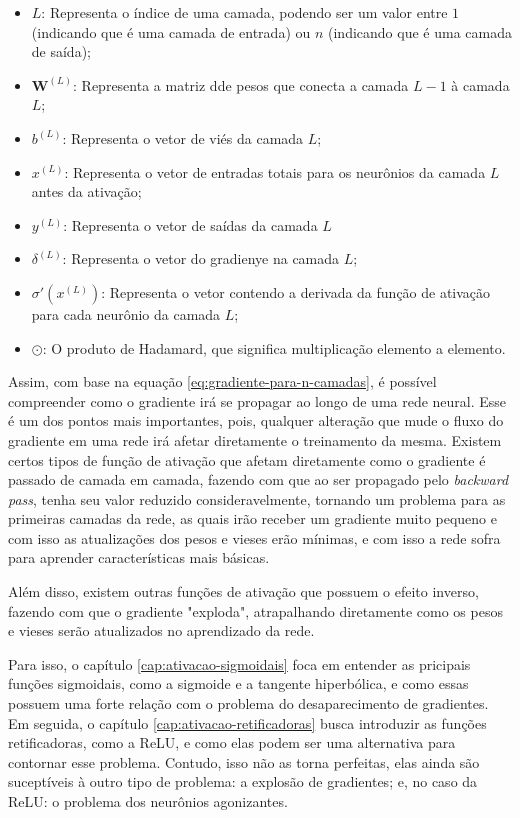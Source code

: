 \begin{itemize}
    \item $L$: Representa o índice de uma camada, podendo ser um valor entre $1$ (indicando que é uma camada de entrada) ou $n$ (indicando que é uma camada de saída);
    \item $\textbf{W}^{(L)}$: Representa a matriz dde pesos que conecta a camada $L - 1$ à camada $L$;
    \item $b^{(L)}$: Representa o vetor de viés da camada $L$;
    \item $x^{(L)}$: Representa o vetor de entradas totais para os neurônios da camada $L$ antes da ativação;
    \item $y^{(L)}$: Representa o vetor de saídas da camada $L$
    \item $\delta^{(L)}$: Representa o vetor do gradienye na camada $L$;
    \item $\sigma'(x^{(L)})$: Representa o vetor contendo a derivada da função de ativação para cada neurônio da camada $L$;
    \item $\odot$: O produto de Hadamard, que significa multiplicação elemento a elemento.
\end{itemize}

Assim, com base na equação \ref{eq:gradiente-para-n-camadas}, é possível compreender como o gradiente irá se propagar ao longo de uma rede neural. Esse é um dos pontos mais importantes, pois, qualquer alteração que mude o fluxo do gradiente em uma rede irá afetar diretamente o treinamento da mesma. Existem certos tipos de função de ativação que afetam diretamente como o gradiente é passado de camada em camada, fazendo com que ao ser propagado pelo \textit{backward pass}, tenha seu valor reduzido consideravelmente, tornando um problema para as primeiras camadas da rede, as quais irão receber um gradiente muito pequeno e com isso as atualizações dos pesos e vieses erão mínimas, e com isso a rede sofra para aprender características mais básicas. 

Além disso, existem outras funções de ativação que possuem o efeito inverso, fazendo com que o gradiente "exploda", atrapalhando diretamente como os pesos e vieses serão atualizados no aprendizado da rede.

Para isso, o capítulo \ref{cap:ativacao-sigmoidais} foca em entender as pricipais funções sigmoidais, como a sigmoide e a tangente hiperbólica, e como essas possuem uma forte relação com o problema do desaparecimento de gradientes. Em seguida, o capítulo \ref{cap:ativacao-retificadoras} busca introduzir as funções retificadoras, como a ReLU, e como elas podem ser uma alternativa para contornar esse problema. Contudo, isso não as torna perfeitas, elas ainda são suceptíveis à outro tipo de problema: a explosão de gradientes; e, no caso da ReLU: o problema dos neurônios agonizantes.

